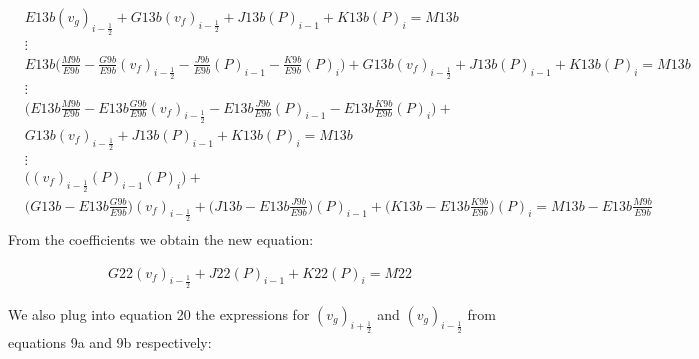 \documentclass[11pt,letterpaper,titlepage]{article}
\newcommand{\half}{\frac{1}{2}}
\begin{document}
\begin{equation*}
\begin{aligned}
&E13b (v_g)_{i-\half} + G13b (v_f)_{i-\half} + J13b (P)_{i-1} + K13b (P)_{i} = M13b\\
&\vdots\\
&E13b \biggr( \frac{M9b}{E9b} - \frac{G9b}{E9b}  (v_f)_{i-\half} - \frac{J9b}{E9b}  (P)_{i-1} - \frac{K9b}{E9b}  (P)_{i} \biggr) + G13b (v_f)_{i-\half} + J13b (P)_{i-1} + K13b (P)_{i} = M13b\\
&\vdots\\
&\biggr( E13b\frac{M9b}{E9b} - E13b\frac{G9b}{E9b}  (v_f)_{i-\half} - E13b\frac{J9b}{E9b}  (P)_{i-1} - E13b\frac{K9b}{E9b}  (P)_{i} \biggr) + \\
&G13b (v_f)_{i-\half} + J13b (P)_{i-1} + K13b (P)_{i} = M13b\\
&\vdots\\
&\biggr(    (v_f)_{i-\half}   (P)_{i-1}   (P)_{i} \biggr) + \\
&\biggr( G13b - E13b\frac{G9b}{E9b} \biggr)(v_f)_{i-\half} + \biggr( J13b - E13b\frac{J9b}{E9b} \biggr)(P)_{i-1} + \biggr( K13b - E13b\frac{K9b}{E9b} \biggr)(P)_{i} = M13b-E13b\frac{M9b}{E9b}\\
\end{aligned}
\end{equation*}
\newline
\newline
\noindent
From the coefficients we obtain the new equation:

\begin{equation}
\begin{aligned}
G22(v_f)_{i-\half} + J22(P)_{i-1} + K22(P)_{i}=M22
\end{aligned}
\end{equation}





\newpage
\noindent
We also plug into equation 20 the expressions for $(v_g)_{i+\half}$ and $(v_g)_{i-\half}$ from equations 9a and 9b respectively:
\end{document}
